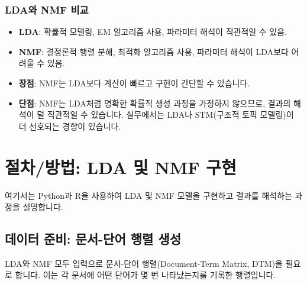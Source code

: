 \documentclass[11pt,a4paper]{article}
\theoremstyle{definition}
\begin{document}
\subsubsection*{LDA와 NMF 비교}
\begin{itemize}
    \item \textbf{LDA}: 확률적 모델링, EM 알고리즘 사용, 파라미터 해석이 직관적일 수 있음.
    \item \textbf{NMF}: 결정론적 행렬 분해, 최적화 알고리즘 사용, 파라미터 해석이 LDA보다 어려울 수 있음.
    \item \textbf{장점}: NMF는 LDA보다 계산이 빠르고 구현이 간단할 수 있습니다.
    \item \textbf{단점}: NMF는 LDA처럼 명확한 확률적 생성 과정을 가정하지 않으므로, 결과의 해석이 덜 직관적일 수 있습니다. 실무에서는 LDA나 STM(구조적 토픽 모델링)이 더 선호되는 경향이 있습니다.
\end{itemize}

\newpage
\section*{절차/방법: LDA 및 NMF 구현}
여기서는 Python과 R을 사용하여 LDA 및 NMF 모델을 구현하고 결과를 해석하는 과정을 설명합니다.

\subsection*{데이터 준비: 문서-단어 행렬 생성}
LDA와 NMF 모두 입력으로 문서-단어 행렬(Document-Term Matrix, DTM)을 필요로 합니다. 이는 각 문서에 어떤 단어가 몇 번 나타났는지를 기록한 행렬입니다.
\end{document}
